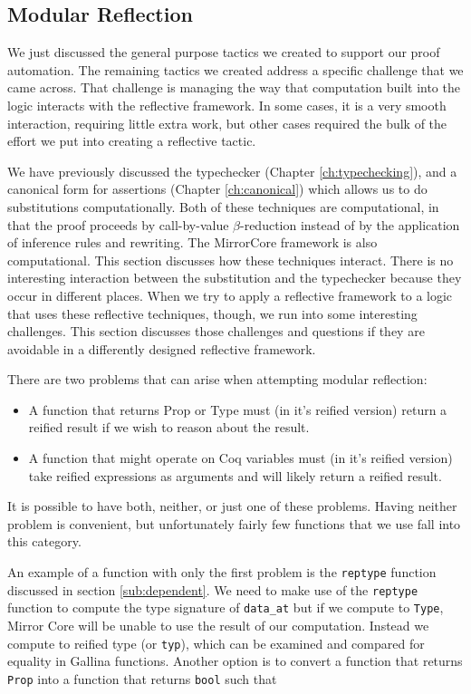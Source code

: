 \documentclass{puthesis}
\begin{document}
\subsection{Modular Reflection}

We just discussed the general purpose tactics we created to support
our proof automation. The remaining tactics we created address a specific
challenge that we came across. That challenge is managing the way that
computation built into the logic interacts with the reflective
framework. In some cases, it is a very smooth interaction, requiring
little extra work, but other cases required the bulk of the effort we
put into creating a reflective tactic.

We have previously discussed the typechecker (Chapter
\ref{ch:typechecking}), and a canonical form for assertions (Chapter
\ref{ch:canonical}) which allows us to do substitutions
computationally.  Both of these techniques are computational, in that
the proof proceeds by call-by-value $\beta$-reduction instead of by the application of
inference rules and rewriting.  The MirrorCore framework is also
computational. This section discusses how these techniques
interact. There is no interesting interaction between the substitution
and the typechecker because they occur in different places. When we
try to apply a reflective framework to a logic that uses these
reflective techniques, though, we run into some interesting
challenges. This section discusses those challenges and questions if
they are avoidable in a differently designed reflective framework.

There are two problems that can arise when attempting modular reflection:

\begin{itemize}
\item A function that returns Prop or Type must (in it's reified version) return a reified
  result if we wish to reason about the result.
\item A function that might operate on Coq variables must (in it's
  reified version) take reified
  expressions as arguments and will likely return a reified result.
\end{itemize}

It is possible to have both, neither, or just one of these problems.
Having neither problem is convenient, but unfortunately fairly few
functions that we use fall into this category. 

An example of a function with only the first problem is the
\lstinline|reptype| function discussed in section
\ref{sub:dependent}. We need to make use of the \lstinline|reptype|
function to compute the type signature of \lstinline|data_at| but if we
compute to \lstinline|Type|, Mirror Core will be unable to use the
result of our computation. Instead we compute to reified type (or
\lstinline|typ|), which can be examined and compared for equality in
Gallina functions. Another option is to convert a function that
returns \lstinline|Prop| into a function that returns \lstinline|bool| such that
\end{document}
